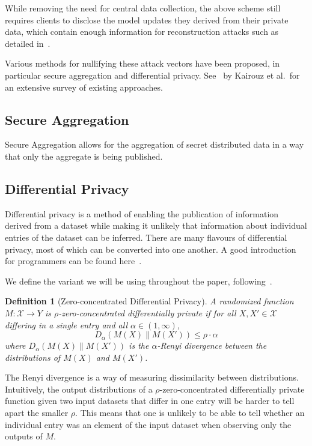 \documentclass{article}
\newtheorem{definition}{Definition}
\begin{document}
While removing the need for central data collection, the above scheme still
requires clients to disclose the model updates they derived from their private
data, which contain enough information for reconstruction attacks such as
detailed in~\cite{7958568,Boenisch2021WhenTC}.

Various methods for nullifying these attack vectors have been proposed, in
particular secure aggregation and differential privacy. See~\cite{fl-survey} by
Kairouz et al.\ for an extensive survey of existing approaches.

\subsection{Secure Aggregation}
Secure Aggregation allows for the aggregation of secret distributed data in a way that only the aggregate is being published.


\subsection{Differential Privacy}
Differential privacy is a method of enabling the publication of information derived from a dataset while making it unlikely that information about individual entries of the dataset can be inferred. There are many flavours of differential privacy, most of which can be converted into one another. A good introduction for programmers can be found here~\cite{near_abuah_2021}.

We define the variant we will be using throughout the paper, following~\cite{DBLP:journals/corr/BunS16}.
\begin{definition}[Zero-concentrated Differential Privacy]
A randomized function $M: \mathcal X\rightarrow Y$ is $\rho$-zero-concentrated differentially private if for all $X,X'\in \mathcal X$ differing in a single entry and all $\alpha\in(1,\infty)$,
$$D_\alpha(M(X)\|M(X'))\leq \rho\cdot\alpha$$
where $D_\alpha(M(X)\|M(X'))$ is the $\alpha$-Renyi divergence between the distributions of $M(X)$ and $M(X')$.
\end{definition}

The Renyi divergence is a way of measuring dissimilarity between distributions. Intuitively, the output distributions of a $\rho$-zero-concentrated differentially private function given two input datasets that differ in one entry will be harder to tell apart the smaller $\rho$. This means that one is unlikely to be able to tell whether an individual entry was an element of the input dataset when observing only the outputs of $M$.
\end{document}
